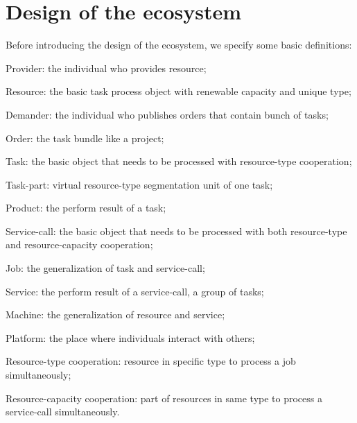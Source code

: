 \section{Design of the ecosystem} %
\label{sec:design_of_the_ecosystem}
Before introducing the design of the ecosystem, we specify some basic definitions:
\begin{compactitem}
	\item Provider: the individual who provides resource;
	\item Resource: the basic task process object with renewable capacity and unique type;
	\item Demander: the individual who publishes orders that contain bunch of tasks;
	\item Order: the task bundle like a project;
	\item Task: the basic object that needs to be processed with resource-type cooperation;
	\item Task-part: virtual resource-type segmentation unit of one task;
	\item Product: the perform result of a task;
    \item Service-call: the basic object that needs to be processed with both resource-type and resource-capacity cooperation;
    \item Job: the generalization of task and service-call;
    \item Service: the perform result of a service-call, a group of tasks;
    \item Machine: the generalization of resource and service;
	\item Platform: the place where individuals interact with others;
    \item Resource-type cooperation: resource in specific type to process a job simultaneously;
    \item Resource-capacity cooperation: part of resources in same type to process a service-call simultaneously.
\end{compactitem}

